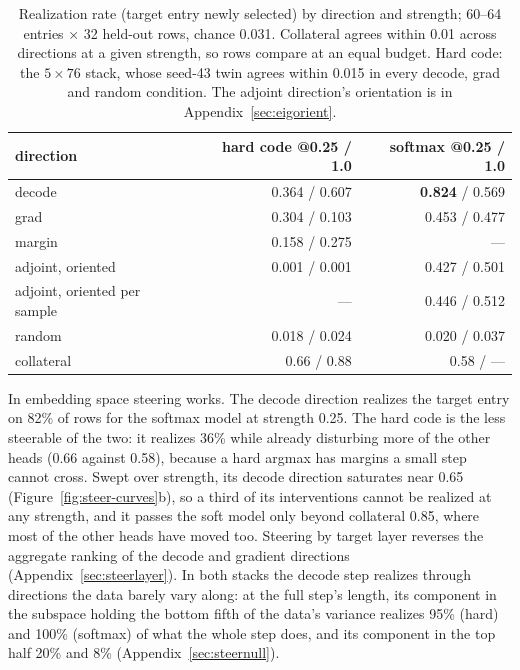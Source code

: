 \begin{table}[htbp]\centering\small
\begin{tabular}{@{}lrr@{}}
\toprule
direction & hard code @0.25 / 1.0 & softmax @0.25 / 1.0 \\
\midrule
decode                       & 0.364 / 0.607 & \textbf{0.824} / 0.569 \\
grad                         & 0.304 / 0.103 & 0.453 / 0.477 \\
margin                       & 0.158 / 0.275 & --- \\
adjoint, oriented            & 0.001 / 0.001 & 0.427 / 0.501 \\
adjoint, oriented per sample & ---           & 0.446 / 0.512 \\
random                       & 0.018 / 0.024 & 0.020 / 0.037 \\
\midrule
collateral                   & 0.66 / 0.88   & 0.58 / --- \\
\bottomrule
\end{tabular}
\caption{Realization rate (target entry newly selected) by direction and
strength; 60--64 entries $\times$ 32 held-out rows, chance 0.031.
Collateral agrees within 0.01 across directions at a given strength, so
rows compare at an equal budget. Hard code: the $5\times76$ stack, whose
seed-43 twin agrees within 0.015 in every decode, grad and random
condition. The adjoint direction's orientation is in
Appendix~\ref{sec:eigorient}.}
\label{tab:steerembed}
\end{table}

In embedding space steering works. The decode direction realizes the
target entry on 82\% of rows for the softmax model at strength 0.25. The
hard code is the less steerable of the two: it realizes 36\% while
already disturbing more of the other heads (0.66 against 0.58), because a
hard argmax has margins a small step cannot cross. Swept over strength,
its decode direction saturates near 0.65 (Figure~\ref{fig:steer-curves}b), so a third of its interventions
cannot be realized at any strength, and it passes the soft model only
beyond collateral 0.85, where most of the other heads have moved too.
Steering by target layer reverses the aggregate ranking of the decode and
gradient directions (Appendix~\ref{sec:steerlayer}). In both stacks the
decode step realizes through directions the data barely vary along: at
the full step's length, its component in the subspace holding the bottom
fifth of the data's variance realizes 95\% (hard) and 100\% (softmax) of
what the whole step does, and its component in the top half 20\% and 8\%
(Appendix~\ref{sec:steernull}).

